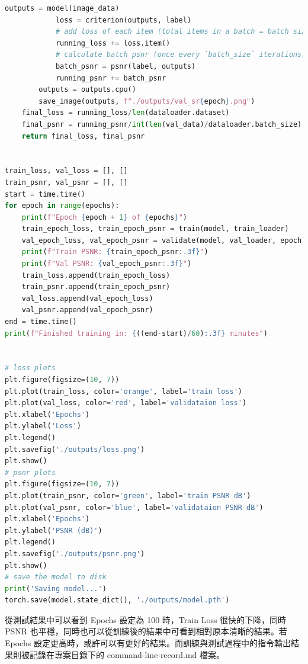 \documentclass[11pt,UTF8]{ctexart}
\begin{document}
\begin{lstlisting}[language={python}]
            outputs = model(image_data)
            loss = criterion(outputs, label)
            # add loss of each item (total items in a batch = batch size) 
            running_loss += loss.item()
            # calculate batch psnr (once every `batch_size` iterations)
            batch_psnr = psnr(label, outputs)
            running_psnr += batch_psnr
        outputs = outputs.cpu()
        save_image(outputs, f"./outputs/val_sr{epoch}.png")
    final_loss = running_loss/len(dataloader.dataset)
    final_psnr = running_psnr/int(len(val_data)/dataloader.batch_size)
    return final_loss, final_psnr


train_loss, val_loss = [], []
train_psnr, val_psnr = [], []
start = time.time()
for epoch in range(epochs):
    print(f"Epoch {epoch + 1} of {epochs}")
    train_epoch_loss, train_epoch_psnr = train(model, train_loader)
    val_epoch_loss, val_epoch_psnr = validate(model, val_loader, epoch)
    print(f"Train PSNR: {train_epoch_psnr:.3f}")
    print(f"Val PSNR: {val_epoch_psnr:.3f}")
    train_loss.append(train_epoch_loss)
    train_psnr.append(train_epoch_psnr)
    val_loss.append(val_epoch_loss)
    val_psnr.append(val_epoch_psnr)
end = time.time()
print(f"Finished training in: {((end-start)/60):.3f} minutes")


# loss plots
plt.figure(figsize=(10, 7))
plt.plot(train_loss, color='orange', label='train loss')
plt.plot(val_loss, color='red', label='validataion loss')
plt.xlabel('Epochs')
plt.ylabel('Loss')
plt.legend()
plt.savefig('./outputs/loss.png')
plt.show()
# psnr plots
plt.figure(figsize=(10, 7))
plt.plot(train_psnr, color='green', label='train PSNR dB')
plt.plot(val_psnr, color='blue', label='validataion PSNR dB')
plt.xlabel('Epochs')
plt.ylabel('PSNR (dB)')
plt.legend()
plt.savefig('./outputs/psnr.png')
plt.show()
# save the model to disk
print('Saving model...')
torch.save(model.state_dict(), './outputs/model.pth')
	\end{lstlisting}

從測試結果中可以看到 Epochs 設定為 100 時，Train Loss 很快的下降，同時 PSNR 也平穩，同時也可以從訓練後的結果中可看到相對原本清晰的結果。若 Epochs 設定更高時，或許可以有更好的結果。而訓練與測試過程中的指令輸出結果則被記錄在專案目錄下的 command-line-record.md 檔案。
\end{document}
